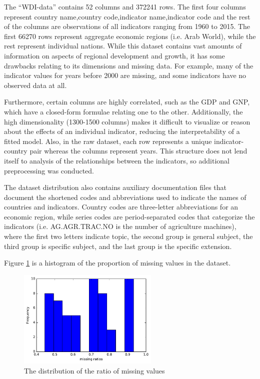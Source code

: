 \documentclass[a4paper]{article}
\begin{document}
The ``WDI-data'' contains 52 columns and 372241 rows. The first four columns represent country name,country code,indicator name,indicator code and the rest of the columns are observations of all indicators ranging from 1960 to 2015. The first 66270 rows represent aggregate economic regions (i.e. Arab World), while the rest represent individual nations. While this dataset contains vast amounts of information on aspects of regional development and growth, it has some drawbacks relating to its dimensions and missing data. For example, many of the indicator values for years before 2000 are missing, and some indicators have no observed data at all.

Furthermore, certain columns are highly correlated, such as the GDP and GNP, which have a closed-form formulae relating one to the other. Additionally, the high dimensionality (1300-1500 columns) makes it difficult to visualize or reason about the effects of an individual indicator, reducing the interpretability of a fitted model. Also, in the raw dataset, each row represents a unique indicator-country pair whereas the columns represent years. This structure does not lend itself to analysis of the relationships between the indicators, so additional preprocessing was conducted.

The dataset distribution also contains auxiliary documentation files that document the shortened codes and abbreviations used to indicate the names of countries and indicators. Country codes are three-letter abbreviations for an economic region, while series codes are period-separated codes that categorize the indicators (i.e. AG.AGR.TRAC.NO is the number of agriculture machines), where the first two letters indicate topic, the second group is general subject, the third group is specific subject, and the last group is the specific extension.

Figure \ref{fig:m1}  is a histogram of the proportion of missing values in the dataset.
\begin{figure}
\centering
\includegraphics[width=0.6\textwidth]{missingRatio.pdf}
\caption{\label{fig:m1}The distribution of the ratio of missing values}
\end{figure}
\end{document}
